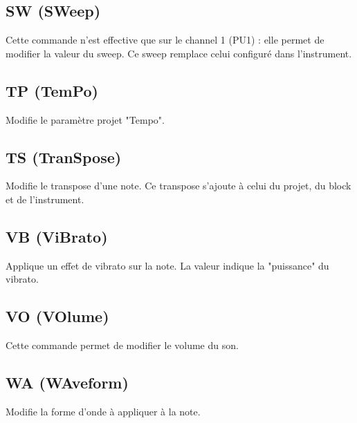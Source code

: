 \subsection{SW (SWeep)}


Cette commande n'est effective que sur le channel 1 (PU1) : elle permet de modifier la valeur du sweep.
Ce sweep remplace celui configuré dans l'instrument.

\subsection{TP (TemPo)}


Modifie le paramètre projet "Tempo".

\subsection{TS (TranSpose)}


Modifie le transpose d'une note. Ce transpose s'ajoute à celui du projet, du block et de l'instrument.

\subsection{VB (ViBrato)}


Applique un effet de vibrato sur la note. La valeur indique la "puissance" du vibrato.

\subsection{VO (VOlume)}


Cette commande permet de modifier le volume du son.

\subsection{WA (WAveform)}


Modifie la forme d'onde à appliquer à la note.

